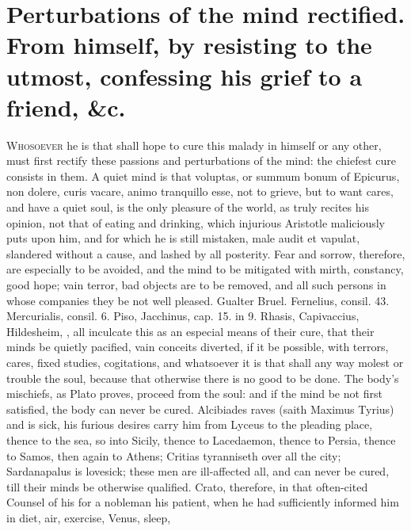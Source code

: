 {%

\section[Perturbations of the mind]{Perturbations of the mind rectified. From himself, by resisting to the utmost, confessing his grief to a friend, \&c.}

\lettrine{W}{hosoever} he is that shall hope to cure this malady in himself or any
other, must first rectify these passions and perturbations of the mind:
the chiefest cure consists in them. A quiet mind is that voluptas, or
summum bonum of Epicurus, non dolere, curis vacare, animo tranquillo
esse, not to grieve, but to want cares, and have a quiet soul, is the
only pleasure of the world, as \Seneca truly recites his opinion, not
that of eating and drinking, which injurious Aristotle maliciously puts
upon him, and for which he is still mistaken, male audit et vapulat,
slandered without a cause, and lashed by all posterity. Fear and
sorrow, therefore, are especially to be avoided, and the mind to be
mitigated with mirth, constancy, good hope; vain terror, bad objects
are to be removed, and all such persons in whose companies they be not
well pleased. Gualter Bruel. Fernelius, consil. 43. Mercurialis,
consil. 6. Piso, Jacchinus, cap. 15. in 9. Rhasis, Capivaccius,
Hildesheim, \etc{}, all inculcate this as an especial means of their cure,
that their minds be quietly pacified, vain conceits diverted, if
it be possible, with terrors, cares,  fixed studies, cogitations,
and whatsoever it is that shall any way molest or trouble the soul,
because that otherwise there is no good to be done. The body's
mischiefs, as Plato proves, proceed from the soul: and if the mind be
not first satisfied, the body can never be cured. Alcibiades raves
(saith Maximus Tyrius) and is sick, his furious desires carry him
from Lyceus to the pleading place, thence to the sea, so into Sicily,
thence to Lacedaemon, thence to Persia, thence to Samos, then again to
Athens; Critias tyranniseth over all the city; Sardanapalus is
lovesick; these men are ill-affected all, and can never be cured, till
their minds be otherwise qualified. Crato, therefore, in that
often-cited Counsel of his for a nobleman his patient, when he had
sufficiently informed him in diet, air, exercise, Venus, sleep,
}
